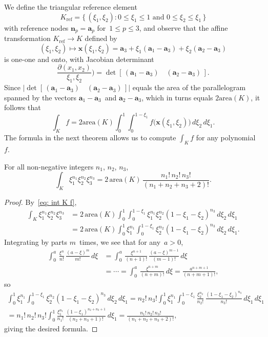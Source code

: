 We define the triangular reference element
\[
K_{\mathrm{ref}}=\{\,(\xi_1,\xi_2):
    \text{$0\le\xi_1\le1$ and $0\le\xi_2\le\xi_1$}\,\}
\]
with reference nodes $\boldsymbol{n}_p=\boldsymbol{a}_p$ for~$1\le p\le 3$,
and observe that the affine transformation $K_{\mathrm{ref}}\to K$ defined by
\[
(\xi_1,\xi_2)\mapsto\boldsymbol{x}(\xi_1,\xi_2)=\boldsymbol{a}_3
    +\xi_1(\boldsymbol{a}_1-\boldsymbol{a}_3)
    +\xi_2(\boldsymbol{a}_2-\boldsymbol{a}_3)
\]
is one-one and onto, with Jacobian determinant
\[
\frac{\partial(x_1,x_2)}{\xi_1,\xi_2})
    =\det[\,(\boldsymbol{a}_1-\boldsymbol{a}_3)\quad
            (\boldsymbol{a}_2-\boldsymbol{a}_3)\,].
\]
Since $\bigl|\det[\,(\boldsymbol{a}_1-\boldsymbol{a}_3)\quad
(\boldsymbol{a}_2-\boldsymbol{a}_3)\,]\bigr|$ equals the area of the 
parallelogram spanned by the vectors $\boldsymbol{a}_1-\boldsymbol{a}_3$~and 
$\boldsymbol{a}_2-\boldsymbol{a}_3$, which in turns equals $2\mathrm{area}(K)$, 
it follows that
\begin{equation}\label{eq: int K f}
\int_Kf=2\mathrm{area}(K)\int_0^1\int_0^{1-\xi_1}
    f\bigl(\boldsymbol{x}(\xi_1,\xi_2)\bigr)\,d\xi_2\,d\xi_1.
\end{equation}
The formula in the next theorem allows us to compute $\int_Kf$ for any 
polynomial~$f$.

\begin{theorem}\label{thm: int xi}
For all non-negative integers $n_1$, $n_2$, $n_3$,
\[
\int_K\xi_1^{n_1}\xi_2^{n_2}\xi_3^{n_3}=2\,\mathrm{area}(K)\,
    \frac{n_1!\,n_2!\,n_3!}{(n_1+n_2+n_3+2)!}.
\]
\end{theorem}
\begin{proof}
By~\eqref{eq: int K f},
\begin{align*}
\int_K\xi_1^{n_1}\xi_2^{n_2}\xi_3^{n_3}&=2\,\mathrm{area}(K)
    \int_0^1\int_0^{1-\xi_1}\xi_1^{n_1}\xi_2^{n_2}(1-\xi_1-\xi_2)^{n_3}
        \,d\xi_2\,d\xi_1\\
    &=2\,\mathrm{area}(K)
    \int_0^1\xi_1^{n_1}\int_0^{1-\xi_1}\xi_2^{n_2}(1-\xi_1-\xi_2)^{n_3}
        \,d\xi_2\,d\xi_1.
\end{align*}
Integrating by parts $m$~times, we see that for any~$a>0$,
\begin{align*}
\int_0^a\,\frac{\xi^n}{n!}\,\frac{(a-\xi)^m}{m!}\,d\xi
&=\int_0^a\,\frac{\xi^{n+1}}{(n+1)!}\,\frac{(a-\xi)^{m-1}}{(m-1)!}\,d\xi\\
&=\cdots
=\int_0^a\,\frac{\xi^{n+m}}{(n+m)!}\,d\xi=\frac{a^{n+m+1}}{(n+m+1)!},
\end{align*}
so
\begin{multline*}
\int_0^1\xi_1^{n_1}\int_0^{1-\xi_1}\xi_2^{n_2}(1-\xi_1-\xi_2)^{n_3}
        \,d\xi_2\,d\xi_1
    =n_2!\,n_3!\int_0^1\xi_1^{n_1}\int_0^{1-\xi_1}
    \frac{\xi_2^{n_2}}{n_2!}\,\frac{(1-\xi_1-\xi_2)^{n_3}}{n_3!}
        \,d\xi_1\,d\xi_1\\
    =n_1!\,n_2!\,n_3!\int_0^1\frac{\xi_1^{n_1}}{n_1!}\,
        \frac{(1-\xi_1)^{n_2+n_3+1}}{(n_2+n_3+1)!}\,d\xi_1
    =\frac{n_1!\,n_2!\,n_3!}{(n_1+n_2+n_3+2)!},
\end{multline*}
giving the desired formula.
\end{proof}

